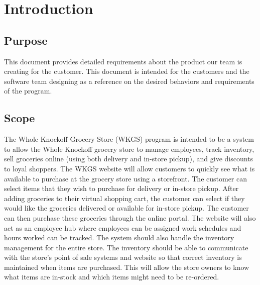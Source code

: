 \documentclass{scrreprt}
\theoremstyle{funreq}
\begin{document}
	\tableofcontents
	
	
	
	\chapter{Introduction}
	
	\section{Purpose}
	This document provides detailed requirements about the product our team is creating for the customer.  This document is intended for the customers and the software team designing as a reference on the desired behaviors and requirements of the program.
	
	\section{Scope}
	The Whole Knockoff Grocery Store (WKGS) program is intended to be a system to allow the Whole Knockoff grocery store to manage employees, track inventory, sell groceries online (using both delivery and in-store pickup), and give discounts to loyal shoppers.  The WKGS website will allow customers to quickly see what is available to purchase at the grocery store using a storefront.  The customer can select items that they wish to purchase for delivery or in-store pickup.  After adding groceries to their virtual shopping cart, the customer can select if they would like the groceries delivered or available for in-store pickup.  The customer can then purchase these groceries through the online portal.  The website will also act as an employee hub where employees can be assigned work schedules and hours worked can be tracked.  The system should also handle the inventory management for the entire store.  The inventory should be able to communicate with the store's point of sale systems and website so that correct inventory is maintained when items are purchased.  This will allow the store owners to know what items are in-stock and which items might need to be re-ordered.
	
\end{document}
